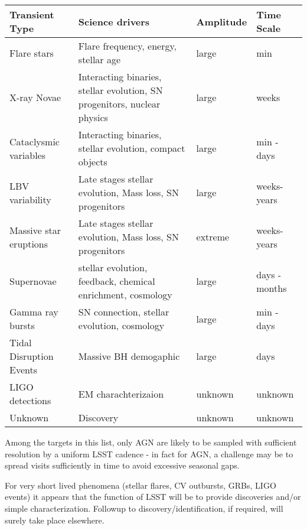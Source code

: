 \begin{center}
\begin{tabular}{| p{3cm} | p{8cm} | l | l |}
\hline Transient Type & Science drivers & Amplitude & Time Scale\\
\hline

Flare stars & Flare frequency, energy, stellar age & large & min \\

X-ray Novae & Interacting binaries, stellar evolution, SN progenitors, nuclear physics & large & weeks \\

Cataclysmic variables  & Interacting binaries, stellar evolution, compact objects & large & min - days\\

LBV variability & Late stages stellar evolution, Mass loss, SN progenitors & large & weeks-years\\

Massive star eruptions &  Late stages stellar evolution, Mass loss, SN progenitors & extreme &  weeks-years\\

Supernovae & stellar evolution, feedback, chemical enrichment, cosmology & large & days - months \\

Gamma ray bursts & SN connection, stellar evolution, cosmology & large & min - days\\

Tidal Disruption Events & Massive BH demogaphic  & large & days\\

LIGO detections &  EM charachterizaion & unknown & unknown\\

Unknown  & Discovery & unknown & unknown\\

 \hline \end{tabular}
 \end{center}

Among the targets in this list, only AGN are likely to be sampled with sufficient resolution by a uniform LSST cadence - in fact for AGN, a challenge may be to spread visits sufficiently in time to avoid excessive seasonal gaps.

For very short lived phenomena (stellar flares, CV outbursts, GRBs, LIGO events) it appears that the function of LSST will be to provide discoveries and/or simple characterization.  Followup to discovery/identification, if required, will surely take place elsewhere.

